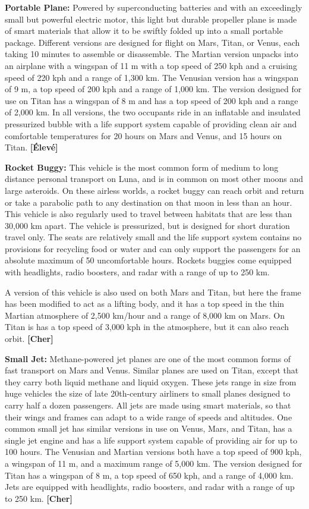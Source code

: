 {{\textbf{Portable Plane:} Powered by superconducting batteries and with an exceedingly small but powerful electric motor, this light but durable propeller plane is made of smart materials that allow it to be swiftly folded up into a small portable package. Different versions are designed for flight on Mars, Titan, or Venus, each taking 10 minutes to assemble or disassemble. The Martian version unpacks into an airplane with a wingspan of 11 m with a top speed of 250 kph and a cruising speed of 220 kph and a range of 1,300 km. The Venusian version has a wingspan of 9 m, a top speed of 200 kph and a range of 1,000 km. The version designed for use on Titan has a wingspan of 8 m and has a top speed of 200 kph and a range of 2,000 km. In all versions, the two occupants ride in an inflatable and insulated pressurized bubble with a life support system capable of providing clean air and comfortable temperatures for 20 hours on Mars and Venus, and 15 hours on Titan. \textbf{[Élevé]} 

\textbf{Rocket Buggy:} This vehicle is the most common form of medium to long distance personal transport on Luna, and is in common on most other moons and large asteroids. On these airless worlds, a rocket buggy can reach orbit and return or take a parabolic path to any destination on that moon in less than an hour. This vehicle is also regularly used to travel between habitats that are less than 30,000 km apart. The vehicle is pressurized, but is designed for short duration travel only. The seats are relatively small and the life support system contains no provisions for recycling food or water and can only support the passengers for an absolute maximum of 50 uncomfortable hours. Rockets buggies come equipped with headlights, radio boosters, and radar with a range of up to 250 km. 

A version of this vehicle is also used on both Mars and Titan, but here the frame has been modified to act as a lifting body, and it has a top speed in the thin Martian atmosphere of 2,500 km/hour and a range of 8,000 km on Mars. On Titan is has a top speed of 3,000 kph in the atmosphere, but it can also reach orbit. \textbf{[Cher]} 

\textbf{Small Jet:} Methane-powered jet planes are one of the most common forms of fast transport on Mars and Venus. Similar planes are used on Titan, except that they carry both liquid methane and liquid oxygen. These jets range in size from huge vehicles the size of late 20th-century airliners to small planes designed to carry half a dozen passengers. All jets are made using smart materials, so that their wings and frames can adapt to a wide range of speeds and altitudes. One common small jet has similar versions in use on Venus, Mars, and Titan, has a single jet engine and has a life support system capable of providing air for up to 100 hours. The Venusian and Martian versions both have a top speed of 900 kph, a wingspan of 11 m, and a maximum range of 5,000 km. The version designed for Titan has a wingspan of 8 m, a top speed of 650 kph, and a range of 4,000 km. Jets are equipped with headlights, radio boosters, and radar with a range of up to 250 km. \textbf{[Cher]} 

}}
